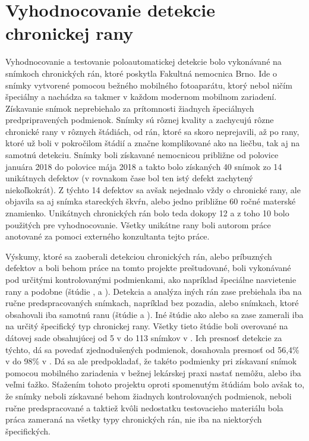 \section{Vyhodnocovanie detekcie chronickej rany}
Vyhodnocovanie a testovanie poloautomatickej detekcie bolo vykonávané na snímkoch chronických rán, ktoré poskytla Fakultná nemocnica Brno. Ide o snímky vytvorené pomocou bežného mobilného fotoaparátu, ktorý nebol ničím špeciálny a nachádza sa takmer v každom modernom mobilnom zariadení. Získavanie snímok neprebiehalo za prítomnosti žiadnych špeciálnych predpripravených podmienok. Snímky sú rôznej kvality a zachycujú rôzne chronické rany v rôznych štádiách, od rán, ktoré sa skoro neprejavili, až po rany, ktoré už boli v pokročilom štádií a značne komplikované ako na liečbu, tak aj na samotnú detekciu. Snímky boli získavané nemocnicou približne od polovice januára 2018 do polovice mája 2018 a takto bolo získaných 40 snímok zo 14 unikátnych defektov (v rovnakom čase bol ten istý defekt zachytený niekoľkokrát). Z týchto 14 defektov sa avšak nejednalo vždy o chronické rany, ale objavila sa aj snímka stareckých škvŕn, alebo jedno približne 60 ročné materské znamienko. Unikátnych chronických rán bolo teda dokopy 12 a z toho 10 bolo použitých pre vyhodnocovanie. Všetky unikátne rany boli autorom práce anotované za pomoci externého konzultanta tejto práce.

Výskumy, ktoré sa zaoberali detekciou chronických rán, alebo príbuzných defektov a boli behom práce na tomto projekte preštudované, boli vykonávané pod určitými kontrolovanými podmienkami, ako napríklad špeciálne nasvietenie rany a podobne (štúdie \cite{4353723}, \cite{6461344} a \cite{6399754}). Detekcia a analýza iných rán zase prebiehala iba na ručne predspracovaných snímkach, napríklad bez pozadia, alebo snímkach, ktoré obsahovali iba samotnú ranu (štúdie \cite{5286322} a \cite{6306219}). Iné štúdie ako \cite{6172044} alebo \cite{6392633} sa zase zamerali iba na určitý špecifický typ chronickej rany. Všetky tieto štúdie boli overované na dátovej sade obsahujúcej od 5 v \cite{6172044} do 113 snímkov v \cite{5286322}. Ich presnosť detekcie za týchto, dá sa povedať zjednodušených podmienok, dosahovala presnosť od 56,4\% v \cite{4353723} do 98\% v \cite{6306219}. Dá sa ale predpokladať, že takéto podmienky pri získavaní snímok pomocou mobilného zariadenia v bežnej lekárskej praxi nastať nemôžu, alebo iba veľmi ťažko. Sťažením tohoto projektu oproti spomenutým štúdiám bolo avšak to, že snímky neboli získavané behom žiadnych kontrolovaných podmienok, neboli ručne predspracované a taktiež kvôli nedostatku testovacieho materiálu bola práca zameraná na všetky typy chronických rán, nie iba na niektorých špecifických. 

